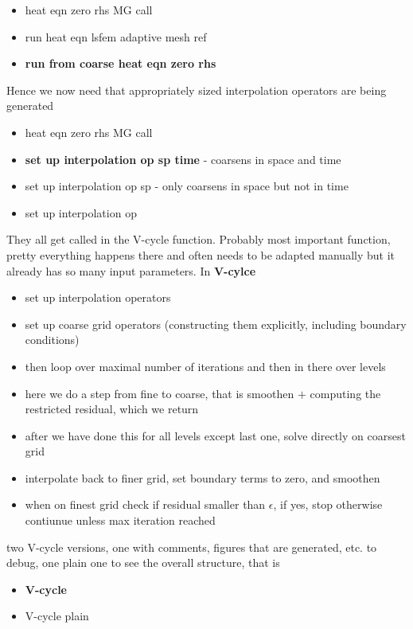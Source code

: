 \documentclass[a4paper, 11pt]{article}
\begin{document}
\begin{itemize}
	\item heat eqn zero rhs MG call
	\item  run heat eqn lsfem adaptive mesh ref
	\item \textbf{run from coarse heat eqn zero rhs}
\end{itemize}

Hence we now need that appropriately sized interpolation operators are being generated

\begin{itemize}
	\item heat eqn zero rhs MG call
	\item \textbf{set up interpolation op sp time} - coarsens in space and time
	\item set up interpolation op sp - only coarsens in space but not in time 
	\item set up interpolation op
\end{itemize}
They all get called in the V-cycle function. Probably most important function, pretty everything happens there and often needs to be adapted manually but it already has so many input parameters. In \textbf{V-cylce}

\begin{itemize}
	\item set up interpolation operators
	\item set up coarse grid operators (constructing them explicitly, including boundary conditions)
	\item then loop over maximal number of iterations and then in there over levels
	\item here we do a step from fine to coarse, that is smoothen $+$ computing the restricted residual, which we return
	\item after we have done this for all levels except last one, solve directly on coarsest grid
	\item interpolate back to finer grid, set boundary terms to zero, and smoothen
	\item when on finest grid check if residual smaller than $\epsilon$, if yes, stop otherwise contiunue unless max iteration reached
\end{itemize}
 
two V-cycle versions, one with comments, figures that are generated, etc. to debug, one plain one to see the overall structure, that is 

\begin{itemize}
	\item \textbf{V-cycle}
	\item V-cycle plain
\end{itemize}
\end{document}
